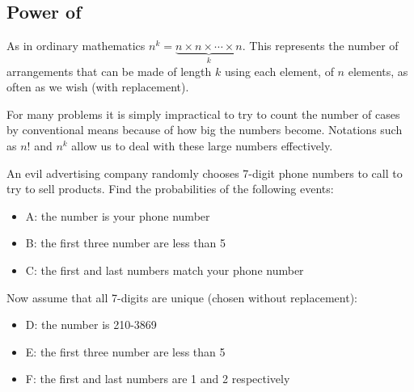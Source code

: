 \subsection*{Power of}
As in ordinary mathematics $n^k = \underbrace{n \times n \times \cdots \times n}_k$. This represents the number of arrangements that can be made of length $k$ using each element, of $n$ elements, as often as we wish (with replacement).
\begin{info}
For many problems it is simply impractical to try to count the number of cases by conventional means because of how big the numbers become. Notations such as $n!$ and $n^k$ allow us to deal with these large numbers effectively.
\end{info}
\begin{example}
An evil advertising company randomly chooses 7-digit phone numbers to call to try to sell products. Find the probabilities of the following events:
\begin{itemize}[noitemsep]
    \item A: the number is your phone number
    \item B: the first three number are less than 5
    \item C: the first and last numbers match your phone number
\end{itemize}
Now assume that all 7-digits are unique (chosen without replacement):
\begin{itemize}[noitemsep]
    \item D: the number is 210-3869
    \item E: the first three number are less than 5
    \item F: the first and last numbers are 1 and 2 respectively
\end{itemize}
\end{example}